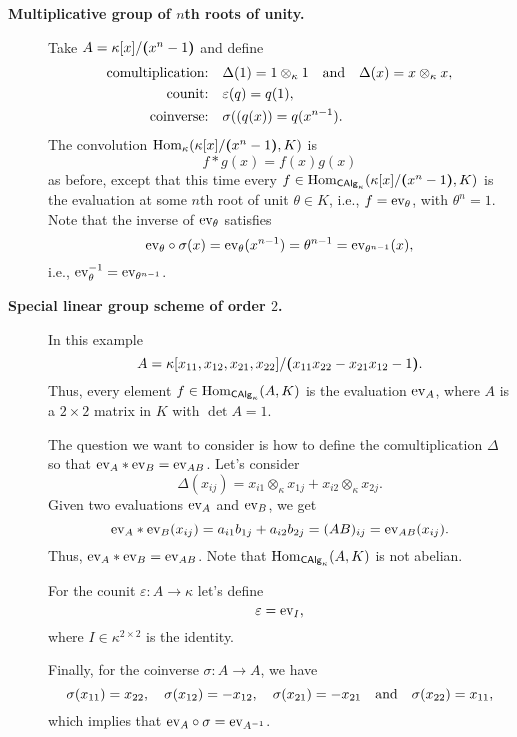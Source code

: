 \begin{xmpls}
\begin{description}
        \item[\textbf{Multiplicative group of $n$th roots of unity.}] Take $A=\kappa[x]/\textrm{\boldmath$($}x^n-1\textrm{\boldmath$)$}$ and define
        \begin{align*}
            \text{comultiplication:}\quad
                &\Delta(1)=1\otimes_\kappa1
                \quad{\rm and}\quad
                \Delta(x)=x\otimes_\kappa x,\\
            \text{counit:}\quad
                &\varepsilon(q)=q(1),\\
            \text{coinverse:}\quad
                &\sigma((q(x))=q(x^{n-1}).
        \end{align*}
        The convolution ${\rm Hom}_\kappa(\kappa[x]/\textrm{\boldmath$($}x^n-1\textrm{\boldmath$)$},K)$ is
        $$
            f*g(x)=f(x)g(x)
        $$
        as before, except that this time every $f\in{\rm Hom}_{\mathsf{CAlg}_\kappa}(\kappa[x]/\textrm{\boldmath$($}x^n-1\textrm{\boldmath$)$},K)$ is the evaluation at some $n$th root of unit $\theta\in K$, i.e., $f=\text{\rm ev}_\theta$, with $\theta^n=1$. Note that the inverse of $\text{\rm ev}_\theta$ satisfies
        $$
            \text{\rm ev}_\theta\circ\sigma(x)
                = \text{\rm ev}_\theta(x^{n-1})
                =\theta^{n-1}
                =\text{\rm ev}_{\theta^{n-1}}(x),
        $$
        i.e., $\text{\rm ev}_\theta^{-1}=\text{\rm ev}_{\theta^{n-1}}$.

        \item[\textbf{Special linear group scheme of order $2$.}] In this example
        $$
            A=\kappa[x_{11},x_{12},x_{21},x_{22}]/\textrm{\boldmath$($}x_{11}x_{22}-x_{21}x_{12}-1\textrm{\boldmath$)$}.
        $$
        Thus, every element $f\in{\rm Hom}_{\mathsf{CAlg}_\kappa}(A,K)$ is the evaluation $\text{\rm ev}_A$, where $A$ is a $2\times2$ matrix in $K$ with $\det A=1$.

        The question we want to consider is how to define the comultiplication $\Delta$ so that $\text{\rm ev}_A*\text{\rm ev}_B=\text{\rm ev}_{AB}$. Let's consider
        $$
            \Delta(x_{ij}) = x_{i1}\otimes_\kappa x_{1j}
                + x_{i2}\otimes_\kappa x_{2j}.
        $$
        Given two evaluations $\text{\rm ev}_A$ and $\text{\rm ev}_B$, we get
        $$
            \text{\rm ev}_A*\text{\rm ev}_B(x_{ij}) = a_{i1}b_{1j}+a_{i2}b_{2j}= (AB)_{ij}
                = \text{\rm ev}_{AB}(x_{ij}).
        $$
        Thus, $\text{\rm ev}_A*\text{\rm ev}_B=\text{\rm ev}_{AB}$. Note that ${\rm Hom}_{\mathsf{CAlg}_\kappa}(A,K)$ is not abelian.

        For the counit $\varepsilon\colon A\to\kappa$ let's define
        $$
            \varepsilon = \text{\rm ev}_I,
        $$
        where $I\in\kappa^{2\times2}$ is the identity.

        Finally, for the coinverse $\sigma\colon A\to A$, we have
        $$
            \sigma(x_{11})=x_{22},\quad\sigma(x_{12})=-x_{12},
                \quad\sigma(x_{21})=-x_{21}\quad{\rm and}\quad
                \sigma(x_{22})=x_{11},
        $$
        which implies that $\text{\rm ev}_A\circ\sigma=\text{\rm ev}_{A^{-1}}$.
    \end{description}
\end{xmpls}

